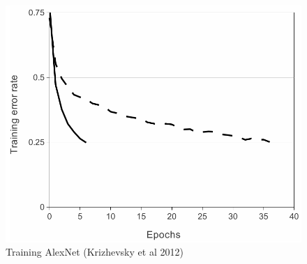 \documentclass[a4paper,11pt]{article}
\begin{document}
\begin{figure}[h!]
	\centering
	\includegraphics[scale=0.3]{images/ReLU_train_fast.png}
	\caption{Training AlexNet (Krizhevsky et al 2012)}
\end{figure}
\end{document}
